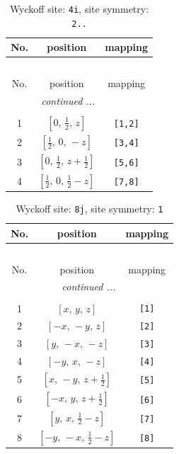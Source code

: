 \documentclass[fleqn,8pt]{jsarticle}
\begin{document}
\renewcommand{\arraystretch}{1.2}
\begin{longtable}{ccc}
\caption{Wyckoff site: {\tt 4i}, site symmetry: {\tt 2..}}
 \\
 \hline \hline
No. & position & mapping \\ \hline \endfirsthead

\multicolumn{2}{l}{\tablename\ \thetable{}} \\
 \hline \hline
No. & position & mapping \\ \hline \endhead

 \hline \hline
\multicolumn{2}{r}{\footnotesize\it continued ...} \\ \endfoot

 \hline \hline
\multicolumn{2}{r}{} \\ \endlastfoot

1 & $\left[ 0,\, \frac{1}{2},\, z \right]$ & {\tt [1,2]} \\ \hline
2 & $\left[ \frac{1}{2},\, 0,\, - z \right]$ & {\tt [3,4]} \\ \hline
3 & $\left[ 0,\, \frac{1}{2},\, z + \frac{1}{2} \right]$ & {\tt [5,6]} \\ \hline
4 & $\left[ \frac{1}{2},\, 0,\, \frac{1}{2} - z \right]$ & {\tt [7,8]} \\
\end{longtable}
\renewcommand{\arraystretch}{1.2}
\begin{longtable}{ccc}
\caption{Wyckoff site: {\tt 8j}, site symmetry: {\tt 1}}
 \\
 \hline \hline
No. & position & mapping \\ \hline \endfirsthead

\multicolumn{2}{l}{\tablename\ \thetable{}} \\
 \hline \hline
No. & position & mapping \\ \hline \endhead

 \hline \hline
\multicolumn{2}{r}{\footnotesize\it continued ...} \\ \endfoot

 \hline \hline
\multicolumn{2}{r}{} \\ \endlastfoot

1 & $\left[ x,\, y,\, z \right]$ & {\tt [1]} \\ \hline
2 & $\left[ - x,\, - y,\, z \right]$ & {\tt [2]} \\ \hline
3 & $\left[ y,\, - x,\, - z \right]$ & {\tt [3]} \\ \hline
4 & $\left[ - y,\, x,\, - z \right]$ & {\tt [4]} \\ \hline
5 & $\left[ x,\, - y,\, z + \frac{1}{2} \right]$ & {\tt [5]} \\ \hline
6 & $\left[ - x,\, y,\, z + \frac{1}{2} \right]$ & {\tt [6]} \\ \hline
7 & $\left[ y,\, x,\, \frac{1}{2} - z \right]$ & {\tt [7]} \\ \hline
8 & $\left[ - y,\, - x,\, \frac{1}{2} - z \right]$ & {\tt [8]} \\
\end{longtable}
\end{document}
